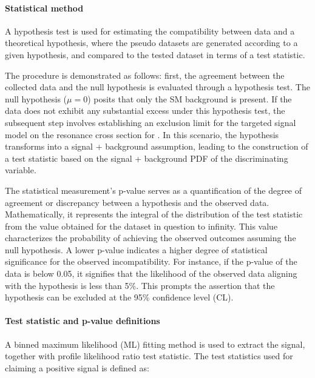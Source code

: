 \paragraph{Statistical method}\mbox{}\par

A hypothesis test is used for estimating the compatibility between data and a theoretical hypothesis, where the pseudo datasets are generated according to a given hypothesis, and compared to the tested dataset in terms of a test statistic.

The procedure is demonstrated as follows: first, the agreement between the collected data and the null hypothesis is evaluated through a hypothesis test. The null hypothesis ($\mu = 0$) posits that only the SM background is present. If the data does not exhibit any substantial excess under this hypothesis test, the subsequent step involves establishing an exclusion limit for the targeted signal model on the resonance cross section for \mjj. In this scenario, the hypothesis transforms into a signal + background assumption, leading to the construction of a test statistic based on the signal + background PDF of the discriminating variable.

The statistical measurement's p-value serves as a quantification of the degree of agreement or discrepancy between a hypothesis and the observed data. Mathematically, it represents the integral of the distribution of the test statistic from the value obtained for the dataset in question to infinity. This value characterizes the probability of achieving the observed outcomes assuming the null hypothesis. A lower p-value indicates a higher degree of statistical significance for the observed incompatibility. For instance, if the p-value of the data is below 0.05, it signifies that the likelihood of the observed data aligning with the hypothesis is less than 5\%. This prompts the assertion that the hypothesis can be excluded at the 95\% confidence level (CL).


\paragraph{Test statistic and p-value definitions}\mbox{}\par

A binned maximum likelihood (ML) fitting method is used to extract the signal, together with profile likelihood ratio test statistic. The test statistics used for claiming a positive signal is defined as:

